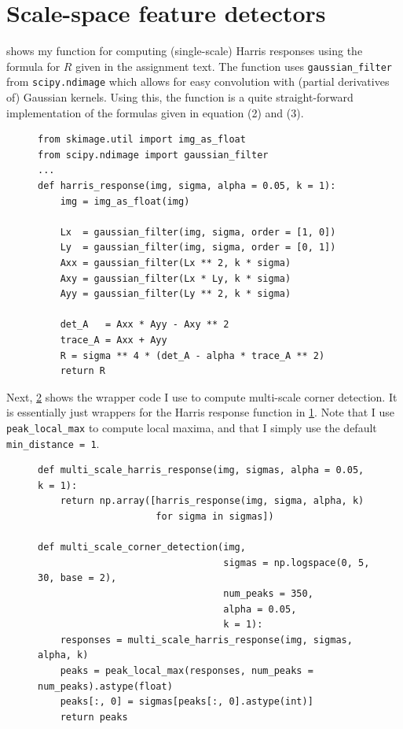 \newpage
\section{Scale-space feature detectors}

 shows my function for computing (single-scale) Harris responses
using the formula for $R$ given in the assignment text. The function uses
\texttt{gaussian\_filter} from \texttt{scipy.ndimage} which allows for easy
convolution with (partial derivatives of) Gaussian kernels. Using this, the
function is a quite straight-forward implementation of the formulas given in
equation (2) and (3).

\begin{figure}[H]
  \centering
  \begin{verbatim}
from skimage.util import img_as_float
from scipy.ndimage import gaussian_filter
...
def harris_response(img, sigma, alpha = 0.05, k = 1):
    img = img_as_float(img)

    Lx  = gaussian_filter(img, sigma, order = [1, 0])
    Ly  = gaussian_filter(img, sigma, order = [0, 1])
    Axx = gaussian_filter(Lx ** 2, k * sigma)
    Axy = gaussian_filter(Lx * Ly, k * sigma)
    Ayy = gaussian_filter(Ly ** 2, k * sigma)

    det_A   = Axx * Ayy - Axy ** 2
    trace_A = Axx + Ayy
    R = sigma ** 4 * (det_A - alpha * trace_A ** 2)
    return R
  \end{verbatim}
  \label{code:R}
\end{figure}

Next, \cref{code:multi_scale_corners} shows the wrapper code I use to compute
multi-scale corner detection. It is essentially just wrappers for the Harris
response function in \cref{code:R}. Note that I use \texttt{peak\_local\_max} to
compute local maxima, and that I simply use the default \texttt{min\_distance =
1}.

\begin{figure}[H]
  \centering
  \begin{verbatim}
def multi_scale_harris_response(img, sigmas, alpha = 0.05, k = 1):
    return np.array([harris_response(img, sigma, alpha, k)
                     for sigma in sigmas])

def multi_scale_corner_detection(img,
                                 sigmas = np.logspace(0, 5, 30, base = 2),
                                 num_peaks = 350,
                                 alpha = 0.05,
                                 k = 1):
    responses = multi_scale_harris_response(img, sigmas, alpha, k)
    peaks = peak_local_max(responses, num_peaks = num_peaks).astype(float)
    peaks[:, 0] = sigmas[peaks[:, 0].astype(int)]
    return peaks
  \end{verbatim}
  \label{code:multi_scale_corners}
\end{figure}


